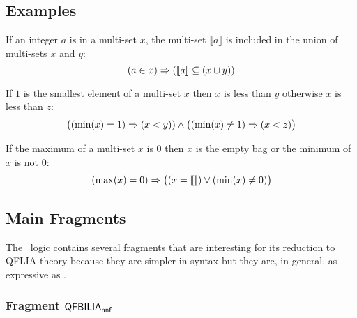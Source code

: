 
\subsection{Examples}

\begin{myex}
If an integer $a$ is in a multi-set $x$, the multi-set $\llbracket a \rrbracket$ is included in the union of multi-sets $x$ and $y$:
\begin{equation}
\label{ex1}
(a \in x) \Rightarrow (\llbracket a \rrbracket \subseteq (x\cup y))
\end{equation}
\end{myex}

\begin{myex}
If $1$ is the smallest element of a multi-set $x$ then $x$ is less than $y$ 
otherwise $x$ is less than $z$:
\begin{equation}
\label{ex2}
\big((\min(x) = 1) \Rightarrow (x<y)) \land \big((\min(x) \neq 1) \Rightarrow (x < z)\big)
\end{equation}
\end{myex}
\begin{myex}
If the maximum of a multi-set $x$ is $0$ then $x$ is the empty bag or the minimum of $x$ is not $0$:
\begin{equation}
\label{ex3}
(\max(x) = 0) \Rightarrow \big((x = \llbracket  \rrbracket) \lor (\min(x) \neq 0)\big)
\end{equation}
\end{myex}


\subsection{Main Fragments}
\label{ssec:frag}

The \QFBILIA\ logic contains several fragments that are interesting for its reduction to QFLIA theory because
they are simpler in syntax but they are, in general, as expressive as \QFBILIA.

\subsubsection{Fragment $\textsf{QFBILIA}_{\textsf{nnf}}$}
\label{sssec:nnf}

